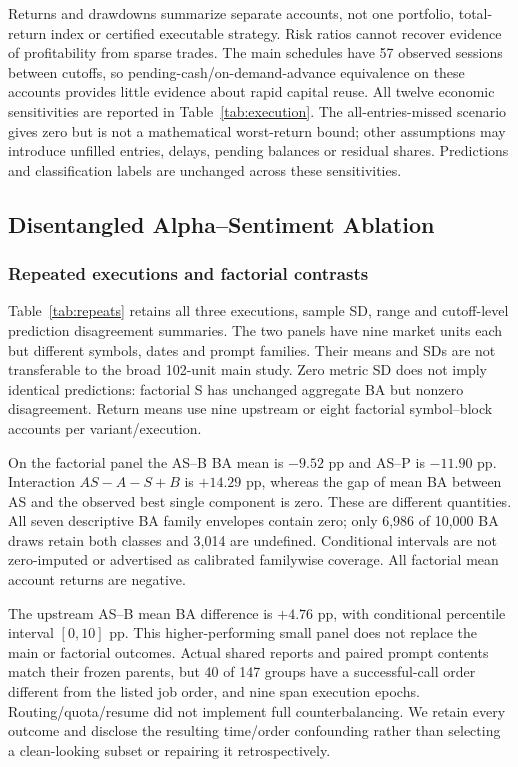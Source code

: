 Returns and drawdowns summarize separate accounts, not one portfolio, total-return index or certified executable strategy. Risk ratios cannot recover evidence of profitability from sparse trades. The main schedules have 57 observed sessions between cutoffs, so pending-cash/on-demand-advance equivalence on these accounts provides little evidence about rapid capital reuse. All twelve economic sensitivities are reported in Table~\ref{tab:execution}. The all-entries-missed scenario gives zero but is not a mathematical worst-return bound; other assumptions may introduce unfilled entries, delays, pending balances or residual shares. Predictions and classification labels are unchanged across these sensitivities.


\subsection{Disentangled Alpha--Sentiment Ablation}
\subsubsection{Repeated executions and factorial contrasts}
Table~\ref{tab:repeats} retains all three executions, sample SD, range and cutoff-level prediction disagreement summaries. The two panels have nine market units each but different symbols, dates and prompt families. Their means and SDs are not transferable to the broad 102-unit main study. Zero metric SD does not imply identical predictions: factorial S has unchanged aggregate BA but nonzero disagreement. Return means use nine upstream or eight factorial symbol--block accounts per variant/execution.

On the factorial panel the AS--B BA mean is $-9.52$ pp and AS--P is $-11.90$ pp. Interaction $AS-A-S+B$ is $+14.29$ pp, whereas the gap of mean BA between AS and the observed best single component is zero. These are different quantities. All seven descriptive BA family envelopes contain zero; only 6,986 of 10,000 BA draws retain both classes and 3,014 are undefined. Conditional intervals are not zero-imputed or advertised as calibrated familywise coverage. All factorial mean account returns are negative.

The upstream AS--B mean BA difference is $+4.76$ pp, with conditional percentile interval $[0,10]$ pp. This higher-performing small panel does not replace the main or factorial outcomes. Actual shared reports and paired prompt contents match their frozen parents, but 40 of 147 groups have a successful-call order different from the listed job order, and nine span execution epochs. Routing/quota/resume did not implement full counterbalancing. We retain every outcome and disclose the resulting time/order confounding rather than selecting a clean-looking subset or repairing it retrospectively.


